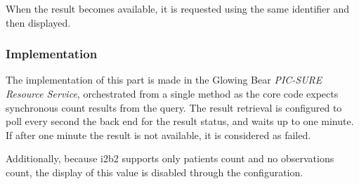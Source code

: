 When the result becomes available, it is requested using the same identifier and then displayed.


\subsubsection{Implementation}

The implementation of this part is made in the Glowing Bear \emph{PIC-SURE Resource Service}, orchestrated from a single method as the core code expects synchronous count results from the query.
The result retrieval is configured to poll every second the back end for the result status, and waits up to one minute.
If after one minute the result is not available, it is considered as failed.

Additionally, because i2b2 supports only patients count and no observations count, the display of this value is disabled through the configuration.
